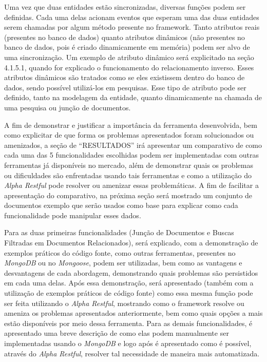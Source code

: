 Uma vez que duas entidades estão sincronizadas, diversas funções podem ser definidas. Cada uma delas acionam eventos que esperam uma das duas entidades serem chamadas por algum método presente no framework. Tanto atributos reais (presentes no banco de dados) quanto atributos dinâmicos (não presentes no banco de dados, pois é criado dinamicamente em memória) podem ser alvo de uma sincronização. Um exemplo de atributo dinâmico será explicitado na seção 4.1.5.1, quando for explicado o funcionamento do relacionamento inverso. Esses atributos dinâmicos são tratados como se eles existissem dentro do banco de dados, sendo possível utilizá-los em pesquisas. Esse tipo de atributo pode ser definido, tanto na modelagem da entidade, quanto dinamicamente na chamada de uma pesquisa ou junção de documentos.

A fim de demonstrar e justificar a importância da ferramenta desenvolvida, bem como explicitar de que forma os problemas apresentados foram solucionados ou amenizados, a seção de ``RESULTADOS'' irá apresentar um comparativo de como cada uma das 5 funcionalidades escolhidas podem ser implementadas com outras ferramentas já disponíveis no mercado, além de demonstrar quais os problemas ou dificuldades são enfrentadas usando tais ferramentas e como a utilização do \textit{Alpha Restful} pode resolver ou amenizar essas problemáticas. A fim de facilitar a apresentação do comparativo, na próxima seção será mostrado um conjunto de documentos exemplo que serão usados como base para explicar como cada funcionalidade pode manipular esses dados.


Para as duas primeiras funcionalidades (Junção de Documentos e Buscas Filtradas em Documentos Relacionados), será explicado, com a demonstração de exemplos práticos do código fonte, como outras ferramentas, presentes no \textit{MongoDB} ou no \textit{Mongoose}, podem ser utilizadas, bem como as vantagens e desvantagens de cada abordagem, demonstrando quais problemas são persistidos em cada uma delas. Após essa demonstração, será apresentado (também com a utilização de exemplos práticos de código fonte) como essa mesma função pode ser feita utilizando o \textit{Alpha Restful}, mostrando como o framework resolve ou ameniza os problemas apresentados anteriormente, bem como quais opções a mais estão disponíveis por meio dessa ferramenta. Para as demais funcionalidades, é apresentado uma breve descrição de como elas podem manualmente ser implementadas usando o \textit{MongoDB} e logo após é apresentado como é possível, através do \textit{Alpha Restful}, resolver tal necessidade de maneira mais automatizada.
